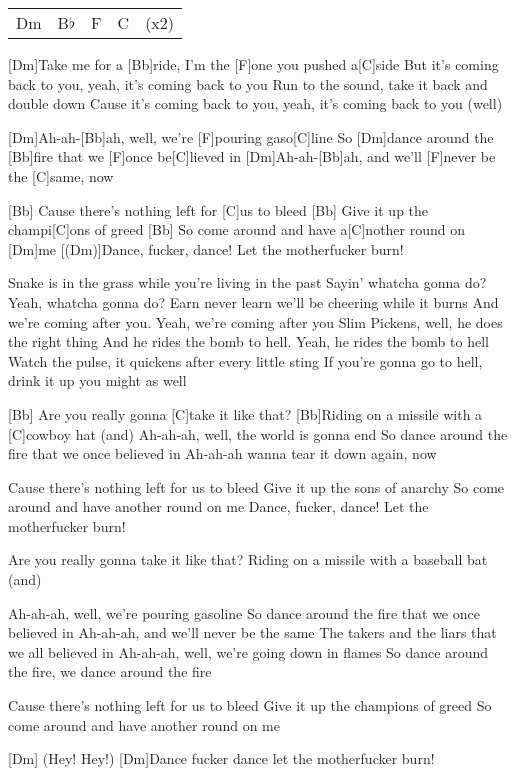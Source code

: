 

\begin{guitar}
	{\footnotesize\begin{tabular}{l|l|l|l l}
			Dm & B$\flat$ & F & C & (x2)
	\end{tabular}}
	
	[Dm]Take me for a [Bb]ride, I'm the [F]one you pushed a[C]side
	But it's coming back to you, yeah, it's coming back to you
	Run to the sound, take it back and double down
	Cause it's coming back to you, yeah, it's coming back to you (well)
	
	[Dm]Ah-ah-[Bb]ah, well, we're [F]pouring gaso[C]line
	So [Dm]dance around the [Bb]fire that we [F]once be[C]lieved in
	[Dm]Ah-ah-[Bb]ah, and we'll [F]never be the [C]same, now
	
	[Bb] Cause there's nothing left for [C]us to bleed
	[Bb] Give it up the champi[C]ons of greed
	[Bb] So come around and have a[C]nother round on [Dm]me
	[(Dm)]Dance, fucker, dance! Let the motherfucker burn!
	
	Snake is in the grass while you're living in the past
	Sayin' whatcha gonna do? Yeah, whatcha gonna do?
	Earn never learn we'll be cheering while it burns
	And we're coming after you. Yeah, we're coming after you
	Slim Pickens, well, he does the right thing
	And he rides the bomb to hell. Yeah, he rides the bomb to hell
	Watch the pulse, it quickens after every little sting
	If you're gonna go to hell, drink it up you might as well
	
	[Bb] Are you really gonna [C]take it like that?
	[Bb]Riding on a missile with a [C]cowboy hat (and)
	\pagebreak
	Ah-ah-ah, well, the world is gonna end
	So dance around the fire that we once believed in
	Ah-ah-ah wanna tear it down again, now
	
	Cause there's nothing left for us to bleed
	Give it up the sons of anarchy
	So come around and have another round on me
	Dance, fucker, dance! Let the motherfucker burn!
	
	
	Are you really gonna take it like that?
	Riding on a missile with a baseball bat (and)
	
	Ah-ah-ah, well, we're pouring gasoline
	So dance around the fire that we once believed in
	Ah-ah-ah, and we'll never be the same
	The takers and the liars that we all believed in
	Ah-ah-ah, well, we're going down in flames
	So dance around the fire, we dance around the fire
	
	Cause there's nothing left for us to bleed
	Give it up the champions of greed
	So come around and have another round on me
	
	[Dm] (Hey! Hey!)
	[Dm]Dance fucker dance let the motherfucker burn!
\end{guitar}